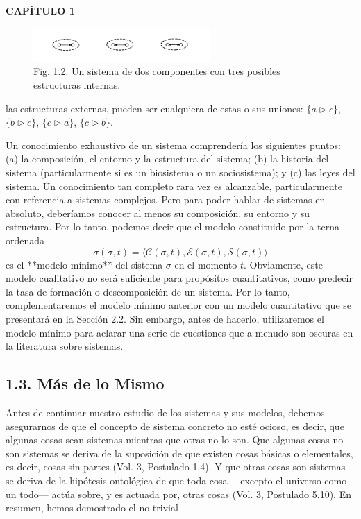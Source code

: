 \fancyhf{}
\fancyhead[l]{\thepage}
\begin{center}
{\fontsize{13}{16}\selectfont \textbf{CAPÍTULO 1}}
\end{center}
\vspace{0.5cm}

{\fontsize{13}{15}\selectfont
\begin{figure}[h!]
    \centering
    \includegraphics[width=0.6\textwidth]{imagenes/figura1.2.png}
    \caption*{Fig. 1.2. Un sistema de dos componentes con tres posibles estructuras internas.}
\end{figure}
las estructuras externas, pueden ser cualquiera de estas o sus uniones: $\{a \triangleright c\}$, $\{b \triangleright c\}$, $\{c \triangleright a\}$, $\{c \triangleright b\}$.

Un conocimiento exhaustivo de un sistema comprendería los siguientes puntos: (a) la composición, el entorno y la estructura del sistema; (b) la historia del sistema (particularmente si es un biosistema o un sociosistema); y (c) las leyes del sistema. Un conocimiento tan completo rara vez es alcanzable, particularmente con referencia a sistemas complejos. Pero para poder hablar de sistemas en absoluto, deberíamos conocer al menos su composición, su entorno y su estructura. Por lo tanto, podemos decir que el modelo constituido por la terna ordenada
$$ \sigma(\sigma, t) = \langle \mathcal{C}(\sigma, t), \mathcal{E}(\sigma, t), \mathcal{S}(\sigma, t) \rangle $$
es el **modelo mínimo** del sistema $\sigma$ en el momento $t$. Obviamente, este modelo cualitativo no será suficiente para propósitos cuantitativos, como predecir la tasa de formación o descomposición de un sistema. Por lo tanto, complementaremos el modelo mínimo anterior con un modelo cuantitativo que se presentará en la Sección 2.2. Sin embargo, antes de hacerlo, utilizaremos el modelo mínimo para aclarar una serie de cuestiones que a menudo son oscuras en la literatura sobre sistemas.

\subsection*{1.3. Más de lo Mismo}
Antes de continuar nuestro estudio de los sistemas y sus modelos, debemos asegurarnos de que el concepto de sistema concreto no esté ocioso, es decir, que algunas cosas sean sistemas mientras que otras no lo son. Que algunas cosas no son sistemas se deriva de la suposición de que existen cosas básicas o elementales, es decir, cosas sin partes (Vol. 3, Postulado 1.4). Y que otras cosas son sistemas se deriva de la hipótesis ontológica de que toda cosa —excepto el universo como un todo— actúa sobre, y es actuada por, otras cosas (Vol. 3, Postulado 5.10). En resumen, hemos demostrado el no trivial

}
